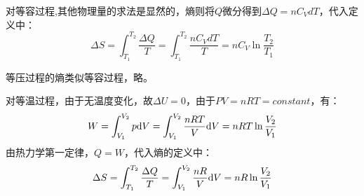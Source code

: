         \begin{prove}
            对等容过程,其他物理量的求法是显然的，熵则将$Q$微分得到$\Delta Q = nC_{V}dT$，代入定义中：
            \begin{equation}
                \Delta S = \int_{T_1}^{T_2} \frac{\Delta Q}{T} = \int_{T_1}^{T_2} \frac{nC_{V}dT}{T} = nC_{V}\ln\frac{T_2}{T_1}
            \end{equation}
            
            等压过程的熵类似等容过程，略。
        \end{prove}
        \begin{prove}
            对等温过程，由于无温度变化，故$\Delta U = 0$，由于$PV = nRT = constant$，有：
            \begin{equation}
                W = \int_{V_1}^{V_2} p \mathrm{d}{V} = \int_{V_1}^{V_2} \frac{nRT}{V} \mathrm{d}{V} = nRT\ln\frac{V_2}{V_1}
            \end{equation}
            由热力学第一定律，$Q = W$，代入熵的定义中：
            \begin{equation}
                \Delta S = \int_{T_1}^{T_2} \frac{\Delta Q}{T} =  \int_{V_1}^{V_2} \frac{nR}{V} \mathrm{d}{V} = nR\ln\frac{V_2}{V_1}
            \end{equation} 
        \end{prove}
